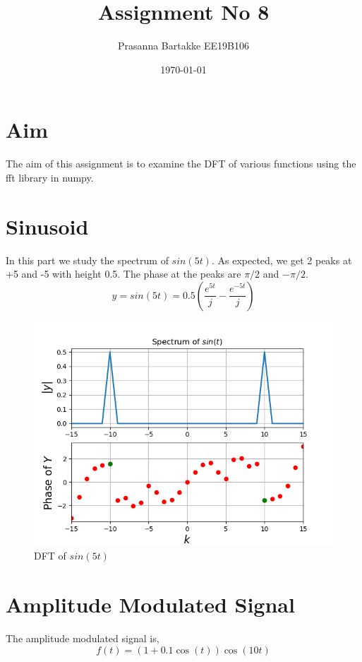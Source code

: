 \documentclass[11pt, a4paper]{article}
\title{Assignment No 8} %
\author{Prasanna Bartakke EE19B106} %
\date{\today} %
\begin{document}
		
		
\maketitle %
\section{Aim}
The aim of this assignment is to examine the DFT of various functions using the fft library in numpy.
\section{Sinusoid}
In this part we study the spectrum of $sin(5t)$. As expected, we get 2 peaks at +5 and -5 with height 0.5. The phase at the peaks are $\pi / 2 $ and $-\pi / 2$.
\begin{equation}
y = sin(5t) = 0.5(\frac{e^{5t}}{j}-\frac{e^{-5t}}{j})
\end{equation}
\begin{figure}[!tbh]
   	\centering
   	\includegraphics[scale=0.5]{fig0.png}  %
   	\caption{DFT of $sin(5t)$}
   	\label{fig:sample}
   \end{figure} 
\section{Amplitude Modulated Signal}
The amplitude modulated signal is,
\begin{equation}
f(t) = (1+0.1\cos(t))\cos(10t)    
\end{equation}
\end{document}
